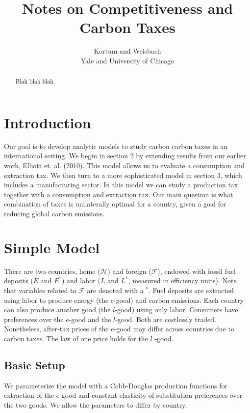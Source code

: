 \documentclass[notitlepage,12pt]{article}
\begin{document}
\title{Notes on Competitiveness and Carbon Taxes}
\author{Kortum and Weisbach \\
Yale and University of Chicago}
\maketitle

\begin{abstract}
Blah blah blah
\end{abstract}

\section{Introduction}

Our goal is to develop analytic models to study carbon carbon taxes in an
international setting. We begin in section 2 by extending results from our
earlier work, Elliott et. al. (2010). This model allows us to evaluate a
consumption and extraction tax. We then turn to a more sophisticated model
in section 3, which includes a manufacturing sector. In this model we can
study a production tax together with a consumption and extraction tax. Our
main question is what combination of taxes is unilaterally optimal for a
country, given a goal for reducing global carbon emissions.

\section{Simple Model}

There are two countries, home ($\mathcal{H}$) and foreign ($\mathcal{F}$),
endowed with fossil fuel deposits ($E$ and $E^{\ast }$) and labor ($L$ and $%
L^{\ast }$, measured in efficiency units). Note that variables related to $%
\mathcal{F}$ are denoted with a $^{\ast }$. Fuel deposits are extracted
using labor to produce energy (the $e$-good) and carbon emissions. Each
country can also produce another good (the $l$-good) using only labor.
Consumers have preferences over the $e$-good and the $l$-good. Both are
costlessly traded. Nonetheless, after-tax prices of the $e$-good may differ
across countries due to carbon taxes. The law of one price holds for the $l$%
-good.

\subsection{Basic Setup}

We parameterize the model with a Cobb-Douglas production functions for
extraction of the $e$-good and constant elasticity of substitution
preferences over the two goods. We allow the parameters to differ by country.
\end{document}
